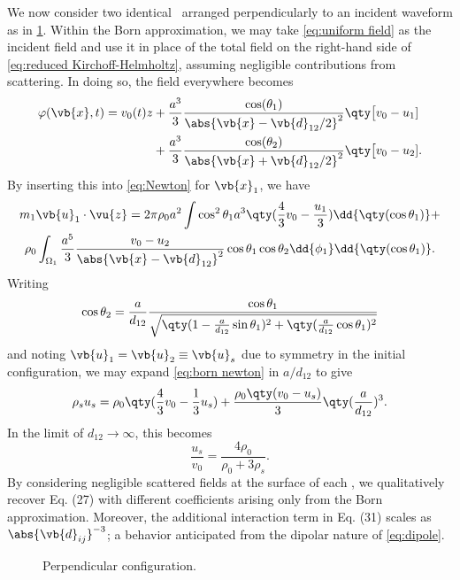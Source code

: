 We now consider two identical \bubbles\ arranged perpendicularly to an incident waveform as in \cref{fig:perpendicular}.
Within the Born approximation, we may take \cref{eq:uniform field} as the incident field and use it in place of the total field on the right-hand side of \cref{eq:reduced Kirchoff-Helmholtz}, assuming negligible contributions from scattering. In doing so, the field everywhere becomes 
\begin{equation}
  \begin{aligned}
  \varphi(\vb{x}, t) = v_0(t) z &+ \frac{a^3}{3} \frac{\cos(\theta_1)}{\abs{\vb{x} - \vb{d}_{12}/2}^2}\qty\big[v_0 - u_1] \\
                                &+ \frac{a^3}{3} \frac{\cos(\theta_2)}{\abs{\vb{x} + \vb{d}_{12}/2}^2}\qty\big[v_0 - u_2].
  \end{aligned}
\end{equation}
By inserting this into \cref{eq:Newton} for $\vb{x}_1$, we have
\begin{equation}
  \label{eq:born newton}
  \begin{gathered}
  m_1 \vb{u}_1 \cdot \vu{z} = 2 \pi \rho_0 a^2 \int \cos^2\theta_1 a^3 \qty(\frac{4}{3}v_0 - \frac{u_1}{3}) \dd{\qty(\cos\theta_1)} + \\
    \rho_0 \int_{\Omega_1} \frac{a^5}{3} \frac{v_0 - u_2}{\abs{\vb{x} - \vb{d}_{12}}^2} \cos\theta_1 \cos\theta_2 \dd{\phi_1} \dd{\qty(\cos \theta_1)}.
  \end{gathered}
\end{equation}
Writing 
\begin{equation}
  \cos\theta_2 = \frac{a}{d_{12}} \frac{\cos\theta_1}{\sqrt{\qty(1 - \frac{a}{d_{12}}\sin\theta_1)^2 + \qty(\frac{a}{d_{12}}\cos\theta_1)^2}}
\end{equation}
and noting $\vb{u}_1 = \vb{u}_2 \equiv \vb{u}_s$ due to symmetry in the initial configuration, we may expand \cref{eq:born newton} in $a/d_{12}$ to give
\begin{equation}
  \label{eq:two bubble born}
  \rho_s u_s = \rho_0\qty(\frac{4}{3}v_0 - \frac{1}{3}u_s) + \frac{\rho_0\qty(v_0 - u_s)}{3}\qty(\frac{a}{d_{12}})^3.
\end{equation}
In the limit of $d_{12} \to \infty$, this becomes
\begin{equation}
  \frac{u_s}{v_0} = \frac{4 \rho_0}{\rho_0 + 3\rho_s}.
\end{equation}
By considering negligible scattered fields at the surface of each \bubble, we qualitatively recover Eq. (27) with different coefficients arising only from the Born approximation. 
Moreover, the additional interaction term in Eq. (31) scales as $\abs{\vb{d}_{ij}}^{-3}$; a behavior anticipated from the dipolar nature of \cref{eq:dipole}.

\begin{figure}
  \centering
  
  \caption{\label{fig:perpendicular}Perpendicular configuration.}
\end{figure}

